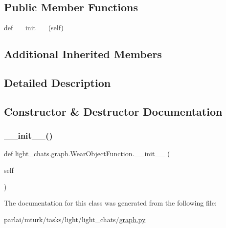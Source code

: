 \subsection*{Public Member Functions}
\begin{DoxyCompactItemize}
\item 
def \hyperlink{classlight__chats_1_1graph_1_1WearObjectFunction_a15f5038591492a7bd7796b664ff94847}{\+\_\+\+\_\+init\+\_\+\+\_\+} (self)
\end{DoxyCompactItemize}
\subsection*{Additional Inherited Members}


\subsection{Detailed Description}
\begin{DoxyVerb}
\end{DoxyVerb}
 

\subsection{Constructor \& Destructor Documentation}
\mbox{\label{classlight__chats_1_1graph_1_1WearObjectFunction_a15f5038591492a7bd7796b664ff94847}} 
\subsubsection{\texorpdfstring{\+\_\+\+\_\+init\+\_\+\+\_\+()}{\_\_init\_\_()}}
{\footnotesize\ttfamily def light\+\_\+chats.\+graph.\+Wear\+Object\+Function.\+\_\+\+\_\+init\+\_\+\+\_\+ (\begin{DoxyParamCaption}\item[{}]{self }\end{DoxyParamCaption})}



The documentation for this class was generated from the following file\+:\begin{DoxyCompactItemize}
\item 
parlai/mturk/tasks/light/light\+\_\+chats/\hyperlink{parlai_2mturk_2tasks_2light_2light__chats_2graph_8py}{graph.\+py}\end{DoxyCompactItemize}
